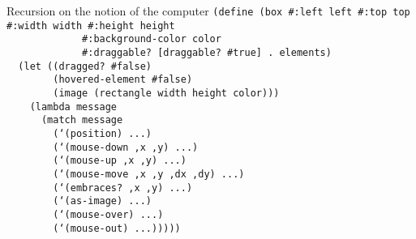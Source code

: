 
\begin{frame}{Recursion on the notion of the computer}
  \tiny
  \texttt{(define (box \#:left left \#:top top \#:width width \#:height height\\
    \ \ \ \ \ \ \ \ \ \ \ \ \ \#:background-color color\\
    \ \ \ \ \ \ \ \ \ \ \ \ \ \#:draggable? [draggable? \#true] . elements)\\
    \ \ (let ((dragged? \#false)\\
    \ \ \ \ \ \ \ \ (hovered-element \#false)\\
    \ \ \ \ \ \ \ \ (image (rectangle width height color)))\\
    \ \ \ \ (lambda message\\
    \ \ \ \ \ \ (match message\\
    \ \ \ \ \ \ \ \ (`(position) ...)\\
    \ \ \ \ \ \ \ \ (`(mouse-down ,x ,y) ...)\\
    \ \ \ \ \ \ \ \ (`(mouse-up ,x ,y) ...)\\
    \ \ \ \ \ \ \ \ (`(mouse-move ,x ,y ,dx ,dy) ...)\\
    \ \ \ \ \ \ \ \ (`(embraces? ,x ,y) ...)\\
    \ \ \ \ \ \ \ \ (`(as-image) ...)\\
    \ \ \ \ \ \ \ \ (`(mouse-over) ...)\\
    \ \ \ \ \ \ \ \ (`(mouse-out) ...)))))\\
    \ \\
    \ \\
    \ \\
    \ \\
    \ \\
    \ \\
    \ \\
    \ \\
    \ \\
    \ \\
    \ \\
    \ 
    }
\end{frame}

